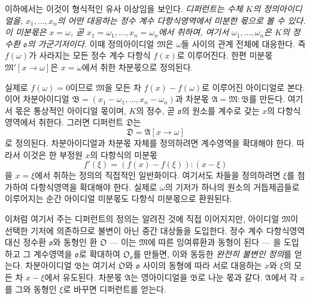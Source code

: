 이하에서는 이것이 형식적인 유사 이상임을 보인다. \emph{디퍼런트는 수체 \(K\)의 정의아이디얼을, \(x_1,\ldots,x_n\)의 어떤 대응하는 정수 계수 다항식영역에서 미분한 몫으로 볼 수 있다. 이 미분몫은 \(x=\omega\), 곧 \(x_1=\omega_1,\ldots,x_n=\omega_n\)에서 취하며, 여기서 \(\omega_1,\ldots,\omega_n\)은 \(K\)의 정수환 \(\mathfrak o\)의 가군기저이다.} 이때 정의아이디얼 \(\mathfrak M\)은 \(\omega\)들 사이의 관계 전체에 대응한다. 즉 \(f(\omega)\)가 사라지는 모든 정수 계수 다항식 \(f(x)\)로 이루어진다. 한편 미분몫 \(\mathfrak M'[x\to\omega]\)은 \(x=\omega\)에서 취한 차분몫으로 정의된다.

실제로 \(f(\omega)=0\)이므로 \(\mathfrak M\)을 모든 차 \(f(x)-f(\omega)\)로 이루어진 아이디얼로 본다. 이어 차분아이디얼 \(\mathfrak B=(x_1-\omega_1,\ldots,x_n-\omega_n)\)과 차분몫 \(\mathfrak A=\mathfrak M:\mathfrak B\)를 만든다. 여기서 몫은 통상적인 아이디얼 몫이며, \(K\)의 정수, 곧 \(\mathfrak o\)의 원소를 계수로 갖는 \(x\)의 다항식영역에서 취한다. 그러면 디퍼런트 \(\mathfrak D\)는
\[
\mathfrak D=\mathfrak A[x\to\omega]
\]
로 정의된다. 차분아이디얼과 차분몫 자체를 정의하려면 계수영역을 확대해야 한다. 따라서 이것은 한 부정원 \(x\)의 다항식의 미분몫
\[
f'(\xi)=(f(x)-f(\xi)):(x-\xi)
\]
을 \(x=\xi\)에서 취하는 정의의 직접적인 일반화이다. 여기서도 차들을 정의하려면 \(\xi\)를 첨가하여 다항식영역을 확대해야 한다. 실제로 \(\omega\)의 기저가 하나의 원소의 거듭제곱들로 이루어지는 순간 아이디얼 미분몫도 다항식 미분몫으로 환원된다.

이처럼 여기서 주는 디퍼런트의 정의는 알려진 것에 직접 이어지지만, 아이디얼 \(\mathfrak M\)이 선택한 기저에 의존하므로 불변이 아닌 중간 대상들을 도입한다. 정수 계수 다항식영역 대신 정수환 \(\mathfrak o\)와 동형인 환 \(\mathfrak O\) --- 이는 \(\mathfrak M\)에 따른 잉여류환과 동형이 된다 --- 을 도입하고 그 계수영역을 \(\mathfrak o\)로 확대하여 \(\mathfrak O_{\mathfrak o}\)를 만들면, 이와 동등한 \emph{완전히 불변인 정의}를 얻는다. 차분아이디얼 \(\mathfrak B\)는 여기서 \(\mathfrak O\)와 \(\mathfrak o\) 사이의 동형에 따라 서로 대응하는 \(x\)와 \(\xi\)의 모든 차 \(x-\xi\)에서 유도된다. 차분몫 \(\mathfrak A\)는 영아이디얼을 \(\mathfrak B\)로 나눈 몫과 같다. \(\mathfrak A\)에서 각 \(x\)를 그와 동형인 \(\xi\)로 바꾸면 디퍼런트를 얻는다.

